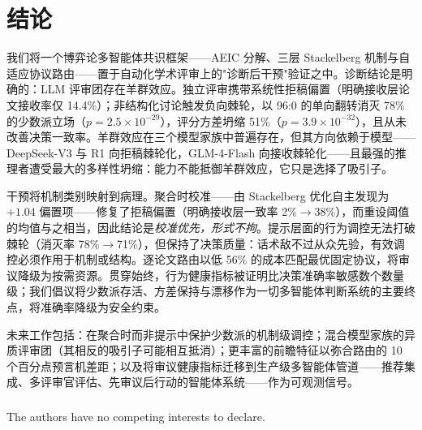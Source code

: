 \section{结论}
\label{sec:conclusion}

我们将一个博弈论多智能体共识框架——AEIC 分解、三层 Stackelberg 机制与自适应协议路由——置于自动化学术评审上的"诊断后干预"验证之中。诊断结论是明确的：LLM 评审团存在羊群效应。独立评审携带系统性拒稿偏置（明确接收层论文接收率仅 14.4\%）；非结构化讨论触发负向棘轮，以 96:0 的单向翻转消灭 78\% 的少数派立场（$p{=}2.5{\times}10^{-29}$），评分方差坍缩 51\%（$p{=}3.9{\times}10^{-32}$），且从未改善决策一致率。羊群效应在三个模型家族中普遍存在，但其方向依赖于模型——DeepSeek-V3 与 R1 向拒稿棘轮化，GLM-4-Flash 向接收棘轮化——且最强的推理者遭受最大的多样性坍缩：能力不能抵御羊群效应，它只是选择了吸引子。

干预将机制类别映射到病理。聚合时校准——由 Stackelberg 优化自主发现为 $+1.04$ 偏置项——修复了拒稿偏置（明确接收层一致率 2\%$\to$38\%），而重设阈值的均值与之相当，因此结论是\emph{校准优先，形式不拘}。提示层面的行为调控无法打破棘轮（消灭率 78\%$\to$71\%），但保持了决策质量：话术敌不过从众先验，有效调控必须作用于机制或结构。逐论文路由以低 56\% 的成本匹配最优固定协议，将审议降级为按需资源。贯穿始终，行为健康指标被证明比决策准确率敏感数个数量级；我们倡议将少数派存活、方差保持与漂移作为一切多智能体判断系统的主要终点，将准确率降级为安全约束。

未来工作包括：在聚合时而非提示中保护少数派的机制级调控；混合模型家族的异质评审团（其相反的吸引子可能相互抵消）；更丰富的前瞻特征以弥合路由的 10 个百分点预言机差距；以及将审议健康指标迁移到生产级多智能体管道——推荐集成、多评审官评估、先审议后行动的智能体系统——作为可观测信号。

\begin{credits}
\subsubsection{\discintname}
The authors have no competing interests to declare.
\end{credits}
